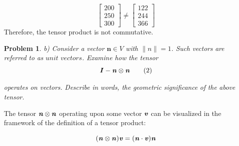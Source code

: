\documentclass[12pt]{article}
\newtheorem{problem}{Problem}
\begin{document}
\[\begin{bmatrix}
    200 \\
    250 \\
    300
    \end{bmatrix} 
\neq     \begin{bmatrix}
        122 \\
        244 \\
        366
        \end{bmatrix}
\]
\vspace*{1cm}
Therefore, the tensor product is not commutative. 

        \begin{problem}
            b) Consider a vector \(\textbf{n}\in V\)   with \(\lVert n\rVert =1 \). Such vectors are referred to as \(\textit{unit vectors}\). Examine how the tensor 
        \[
            \textbf{\textit{I}}  - \textbf{\textit{n}}  \otimes \textbf{\textit{n}}  \tag{2} 
        \]  
        
        operates on vectors. Describe in words, the geometric significance of the above tensor.
        \end{problem}
        \vspace{1cm}

        The tensor \(\textbf{\textit{n}} \otimes  \textbf{\textit{n}} \) operating upon some vector \(\textbf{\textit{v}} \) can be visualized in the framework of the definition of a tensor product:

        \[
            (\textbf{\textit{n}} \otimes \textbf{\textit{n}} ) \textbf{\textit{v}} = (\textbf{\textit{n}} \cdot \textbf{\textit{v}} )\textbf{\textit{n}} 
        \]
\end{document}
